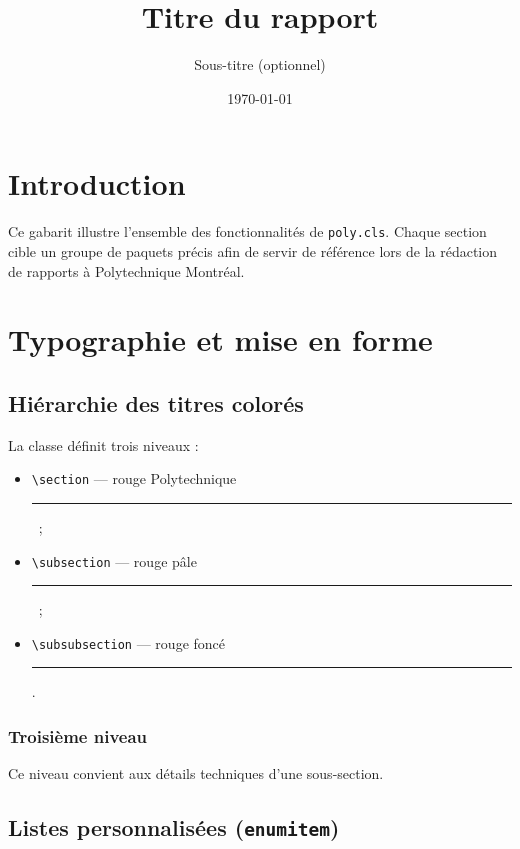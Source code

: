 \documentclass{poly}
\title{Titre du rapport}
\subtitle{Sous-titre (optionnel)}
\date{\today}
\begin{document}
\maketitle   %
\tableofcontents
\printnomenclature %
\listoffigures
\listoftables

\newpage
{}
\setcounter{page}{1}

\section{Introduction}

Ce gabarit illustre l'ensemble des fonctionnalités de \texttt{poly.cls}.
Chaque section cible un groupe de paquets précis afin de servir de
référence lors de la rédaction de rapports à Polytechnique Montréal.

\section{Typographie et mise en forme}

\subsection{Hiérarchie des titres colorés}

La classe définit trois niveaux :
\begin{itemize}[label=\textbullet, noitemsep]
    \item \texttt{\textbackslash section} — rouge Polytechnique
          \textcolor{titre}{\rule{0.8em}{0.8ex}}~;
    \item \texttt{\textbackslash subsection} — rouge pâle
          \textcolor{soustitre}{\rule{0.8em}{0.8ex}}~;
    \item \texttt{\textbackslash subsubsection} — rouge foncé
          \textcolor{sousoustitre}{\rule{0.8em}{0.8ex}}.
\end{itemize}

\subsubsection{Troisième niveau}

Ce niveau convient aux détails techniques d'une sous-section.

\subsection{Listes personnalisées (\texttt{enumitem})}
\end{document}
